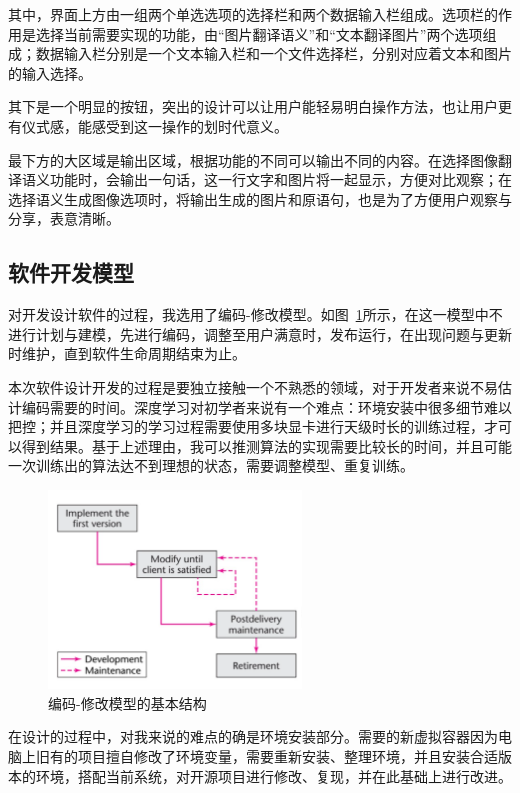   其中，界面上方由一组两个单选选项的选择栏和两个数据输入栏组成。选项栏的作用是选择当前需要实现的功能，由“图片翻译语义”和“文本翻译图片”两个选项组成；数据输入栏分别是一个文本输入栏和一个文件选择栏，分别对应着文本和图片的输入选择。

  其下是一个明显的按钮，突出的设计可以让用户能轻易明白操作方法，也让用户更有仪式感，能感受到这一操作的划时代意义。

  最下方的大区域是输出区域，根据功能的不同可以输出不同的内容。在选择图像翻译语义功能时，会输出一句话，这一行文字和图片将一起显示，方便对比观察；在选择语义生成图像选项时，将输出生成的图片和原语句，也是为了方便用户观察与分享，表意清晰。

\subsection{软件开发模型}
对开发设计软件的过程，我选用了编码-修改模型。如图~\ref{fig:codenfix}所示，在这一模型中不进行计划与建模，先进行编码，调整至用户满意时，发布运行，在出现问题与更新时维护，直到软件生命周期结束为止。

本次软件设计开发的过程是要独立接触一个不熟悉的领域，对于开发者来说不易估计编码需要的时间。深度学习对初学者来说有一个难点：环境安装中很多细节难以把控；并且深度学习的学习过程需要使用多块显卡进行天级时长的训练过程，才可以得到结果。基于上述理由，我可以推测算法的实现需要比较长的时间，并且可能一次训练出的算法达不到理想的状态，需要调整模型、重复训练。

\begin{figure}[!htb]
    \centering
    \includegraphics[width=0.6\textwidth]{figures/codeandfix.png}
    \caption{编码-修改模型的基本结构}
    \label{fig:codenfix}
\end{figure}

在设计的过程中，对我来说的难点的确是环境安装部分。需要的新虚拟容器因为电脑上旧有的项目擅自修改了环境变量，需要重新安装、整理环境，并且安装合适版本的环境，搭配当前系统，对开源项目进行修改、复现，并在此基础上进行改进。

